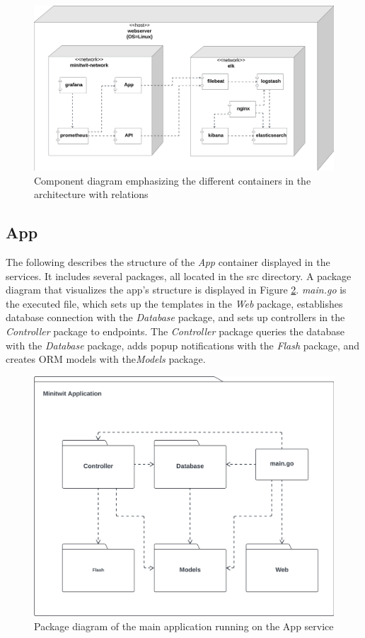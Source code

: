 \documentclass[12pt, a4paper, oneside]{book}
\begin{document}
\begin{figure}[H]
    \centering
    \includegraphics[width=0.8\linewidth]{images/uml-component-containers.png}
    \caption{Component diagram emphasizing the different containers in the architecture with relations}
    \label{fig:uml-containers}
\end{figure}

\subsection{App}
The following describes the structure of the \textit{App} container displayed in the services.
It includes several packages, all located in the src directory.
A package diagram that visualizes the app's structure is displayed in Figure \ref{fig:package-diagram-app}.
\textit{main.go} is the executed file, which sets up the templates in the \textit{Web} package, establishes database connection with the \textit{Database} package, and sets up controllers in the \textit{Controller} package to endpoints.
The \textit{Controller} package queries the database with the \textit{Database} package, adds popup notifications with the \textit{Flash} package, and creates ORM models with the\textit{Models} package.

\begin{figure}[H]
    \centering
    \includegraphics[width=0.6\linewidth]{images/uml-package-app.png}
    \caption{Package diagram of the main application running on the App service}
    \label{fig:package-diagram-app}
\end{figure}
\end{document}
